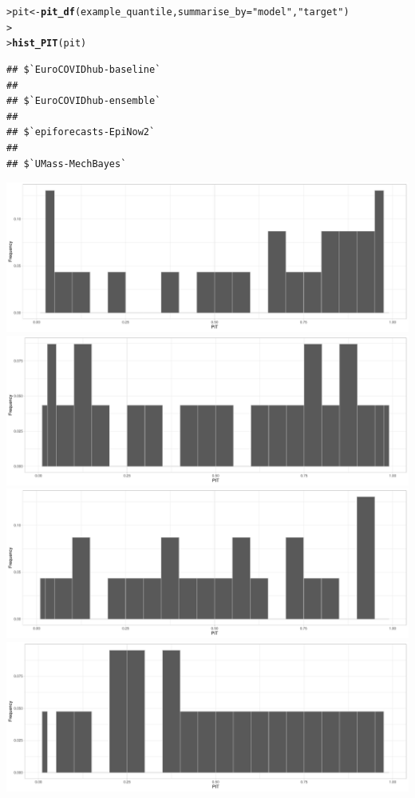 \documentclass[article,shortnames]{jss}\usepackage[]{graphicx}\usepackage[]{color}
\makeatletter
\newcommand{\hlstr}[1]{\textcolor[rgb]{0.192,0.494,0.8}{#1}}%
\newcommand{\hlstd}[1]{\textcolor[rgb]{0.345,0.345,0.345}{#1}}%
\newcommand{\hlkwb}[1]{\textcolor[rgb]{0.69,0.353,0.396}{#1}}%
\newcommand{\hlkwc}[1]{\textcolor[rgb]{0.333,0.667,0.333}{#1}}%
\newcommand{\hlkwd}[1]{\textcolor[rgb]{0.737,0.353,0.396}{\textbf{#1}}}%
\newenvironment{kframe}{%
 \def\at@end@of@kframe{}%
 \ifinner\ifhmode%
  \def\at@end@of@kframe{\end{minipage}}%
  \begin{minipage}{\columnwidth}%
 \fi\fi%
 \def\FrameCommand##1{\hskip\@totalleftmargin \hskip-\fboxsep
 \colorbox{shadecolor}{##1}\hskip-\fboxsep
     \hskip-\linewidth \hskip-\@totalleftmargin \hskip\columnwidth}%
 \MakeFramed {\advance\hsize-\width
   \@totalleftmargin\z@ \linewidth\hsize
   \@setminipage}}%
 {\par\unskip\endMakeFramed%
 \at@end@of@kframe}
\newenvironment{knitrout}{}{} %
\makeatother
\begin{document}
\begin{knitrout}
\color{fgcolor}\begin{kframe}
\begin{alltt}
\hlstd{> }\hlstd{pit} \hlkwb{<-} \hlkwd{pit_df}\hlstd{(example_quantile,} \hlkwc{summarise_by} \hlstd{=} \hlstr{"model"}\hlstd{,} \hlstr{"target"}\hlstd{)}
\hlstd{> }
\hlstd{> }\hlkwd{hist_PIT}\hlstd{(pit)}
\end{alltt}
\begin{verbatim}
## $`EuroCOVIDhub-baseline`
## 
## $`EuroCOVIDhub-ensemble`
## 
## $`epiforecasts-EpiNow2`
## 
## $`UMass-MechBayes`
\end{verbatim}
\end{kframe}

\includegraphics[width=0.49\linewidth]{plots/plot-pit-plots-1} 
\includegraphics[width=0.49\linewidth]{plots/plot-pit-plots-2} 
\includegraphics[width=0.49\linewidth]{plots/plot-pit-plots-3} 
\includegraphics[width=0.49\linewidth]{plots/plot-pit-plots-4} 
\end{knitrout}
\end{document}
